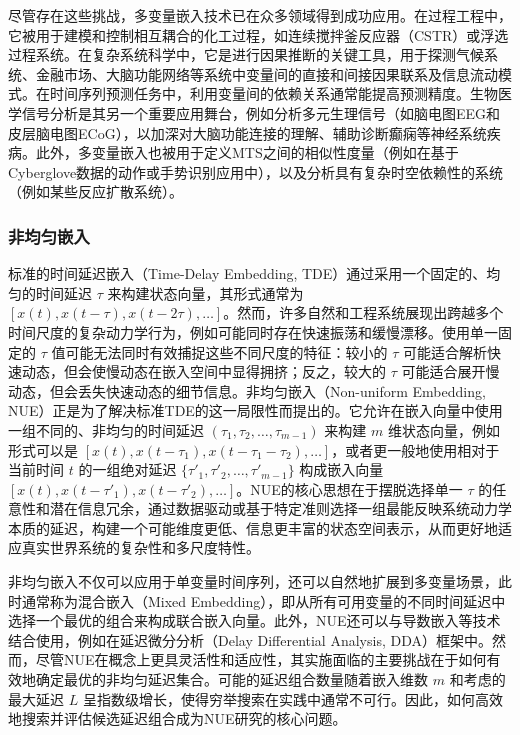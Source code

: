 尽管存在这些挑战，多变量嵌入技术已在众多领域得到成功应用。在过程工程中，它被用于建模和控制相互耦合的化工过程，如连续搅拌釜反应器（CSTR）或浮选过程系统。在复杂系统科学中，它是进行因果推断的关键工具，用于探测气候系统、金融市场、大脑功能网络等系统中变量间的直接和间接因果联系及信息流动模式。在时间序列预测任务中，利用变量间的依赖关系通常能提高预测精度。生物医学信号分析是其另一个重要应用舞台，例如分析多元生理信号（如脑电图EEG和皮层脑电图ECoG），以加深对大脑功能连接的理解、辅助诊断癫痫等神经系统疾病。此外，多变量嵌入也被用于定义MTS之间的相似性度量（例如在基于Cyberglove数据的动作或手势识别应用中），以及分析具有复杂时空依赖性的系统（例如某些反应扩散系统）。

\subsubsection{非均匀嵌入}
标准的时间延迟嵌入（Time-Delay Embedding, TDE）通过采用一个固定的、均匀的时间延迟 $\tau$ 来构建状态向量，其形式通常为 $[x(t), x(t-\tau), x(t-2\tau), \dots]$。然而，许多自然和工程系统展现出跨越多个时间尺度的复杂动力学行为，例如可能同时存在快速振荡和缓慢漂移。使用单一固定的 $\tau$ 值可能无法同时有效捕捉这些不同尺度的特征：较小的 $\tau$ 可能适合解析快速动态，但会使慢动态在嵌入空间中显得拥挤；反之，较大的 $\tau$ 可能适合展开慢动态，但会丢失快速动态的细节信息。非均匀嵌入（Non-uniform Embedding, NUE）正是为了解决标准TDE的这一局限性而提出的。它允许在嵌入向量中使用一组不同的、非均匀的时间延迟 $(\tau_1, \tau_2, \dots, \tau_{m-1})$ 来构建 $m$ 维状态向量，例如形式可以是 $[x(t), x(t-\tau_1), x(t-\tau_1-\tau_2), \dots]$，或者更一般地使用相对于当前时间 $t$ 的一组绝对延迟 $\{\tau'_1, \tau'_2, \dots, \tau'_{m-1}\}$ 构成嵌入向量 $[x(t), x(t-\tau'_1), x(t-\tau'_2), \dots]$。NUE的核心思想在于摆脱选择单一 $\tau$ 的任意性和潜在信息冗余，通过数据驱动或基于特定准则选择一组最能反映系统动力学本质的延迟，构建一个可能维度更低、信息更丰富的状态空间表示，从而更好地适应真实世界系统的复杂性和多尺度特性。

非均匀嵌入不仅可以应用于单变量时间序列，还可以自然地扩展到多变量场景，此时通常称为混合嵌入（Mixed Embedding），即从所有可用变量的不同时间延迟中选择一个最优的组合来构成联合嵌入向量。此外，NUE还可以与导数嵌入等技术结合使用，例如在延迟微分分析（Delay Differential Analysis, DDA）框架中。然而，尽管NUE在概念上更具灵活性和适应性，其实施面临的主要挑战在于如何有效地确定最优的非均匀延迟集合。可能的延迟组合数量随着嵌入维数 $m$ 和考虑的最大延迟 $L$ 呈指数级增长，使得穷举搜索在实践中通常不可行。因此，如何高效地搜索并评估候选延迟组合成为NUE研究的核心问题。

